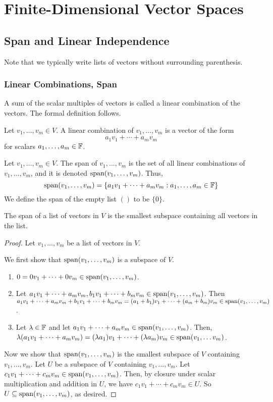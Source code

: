 \chapter{Finite-Dimensional Vector Spaces}
\section{Span and Linear Independence}
Note that we typically write lists of vectors without surrounding parenthesis.
\subsection*{Linear Combinations, Span}
A sum of the scalar multiples of vectors is called a linear combination of the vectors. The formal definition follows.
\begin{definition}
    Let $v_1, \dots, v_m \in V$. A linear combination of $v_1, \dots, v_m$ is a vector of the form
    \[ a_1v_1 + \cdots + a_mv_m\]
    for scalars $a_1, \dots, a_m \in \mathbb F$.
\end{definition}
\begin{definition}[Span]
    Let $v_1, \dots, v_m\in V$. The span of $v_1, \dots, v_m$ is the set of all linear combinations of $v_1, \dots, v_m$, and it is denoted $\operatorname{span}(v_1, \dots, v_m)$. Thus,
    \[ \operatorname{span}(v_1, \dots, v_m) = \{ a_1v_1 + \cdots + a_mv_m : a_1, \dots, a_m \in \mathbb F \} \]
    We define the span of the empty list $()$ to be $\{0\}$.
\end{definition}
\begin{theorem}
    The span of a list of vectors in $V$ is the smallest subspace containing all vectors in the list.
\end{theorem}
\begin{proof}
    Let $v_1, \dots, v_m$ be a list of vectors in $V$. 

    We first show that $\operatorname{span}(v_1, \dots, v_m)$ is a subspace of $V$. 
    \begin{enumerate}
        \item $0 = 0v_1 + \cdots + 0v_m\in \operatorname{span}(v_1, \dots, v_m)$. 
        \item Let $a_1v_1 + \cdots + a_mv_m, b_1v_1 + \cdots + b_mv_m\in \operatorname{span}(v_1, \dots, v_m)$. Then $a_1v_1 + \cdots + a_mv_m + b_1v_1 + \cdots + b_mv_m = (a_1+b_1)v_1 + \cdots + (a_m+b_m)v_m \in \operatorname{span}(v_1, \dots, v_m)$.
        \item Let $\lambda\in \mathbb F$ and let $a_1v_1 + \cdots + a_mv_m\in\operatorname{span}(v_1, \dots, v_m)$. Then, $\lambda(a_1v_1 + \cdots + a_mv_m) = (\lambda a_1)v_1 + \cdots + (\lambda a_m)v_m \in \operatorname{span}(v_1, \dots v_m)$.
    \end{enumerate}
    Now we show that $\operatorname{span}(v_1, \dots, v_m)$ is the smallest subspace of $V$ containing $v_1, \dots, v_m$. Let $U$ be a subspace of $V$ containing $v_1, \dots, v_m$. Let $c_1v_1 + \cdots + c_mv_m\in\operatorname{span}(v_1, \dots, v_m)$. Then, by closure under scalar multiplication and addition in $U$, we have $c_1v_1 + \cdots + c_mv_m \in U$. So $U\subseteq\operatorname{span}(v_1, \dots, v_m)$, as desired.
\end{proof}
